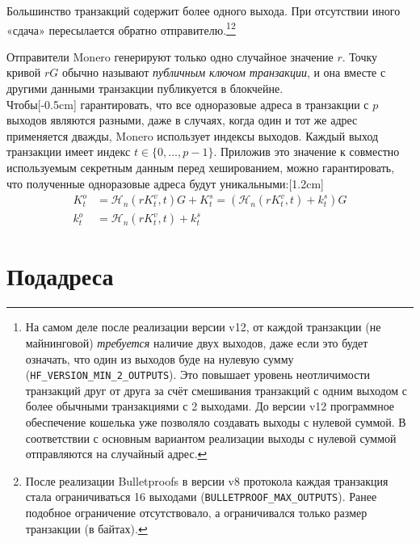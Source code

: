 Большинство транзакций содержит более одного выхода. При отсутствии иного «сдача» пересылается обратно отправителю.\footnote{На самом деле после реализации версии v12, от каждой транзакции  (не майнинговой) {\em требуется} наличие двух выходов, даже если это будет означать, что один из выходов буде на нулевую сумму ({\tt HF\_VERSION\_MIN\_2\_OUTPUTS}). Это повышает уровень неотличимости транзакций друг от друга за счёт смешивания транзакций с одним выходом с более обычными транзакциями с 2 выходами. До версии v12 программное обеспечение кошелька уже позволяло создавать выходы с нулевой суммой. В соответствии с основным вариантом реализации выходы с нулевой суммой отправляются на случайный адрес.}\footnote{После реализации Bulletproofs в версии v8 протокола каждая транзакция стала ограничиваться 16 выходами ({\tt BULLETPROOF\_MAX\_OUTPUTS}). Ранее подобное ограничение отсутствовало, а ограничивался только размер транзакции (в байтах).}%

Отправители Monero генерируют только одно случайное значение $r$. Точку кривой $r G$ обычно называют {\em публичным ключом транзакции}, и она вместе с другими данными транзакции публи\-куется в блокчейне.\\

Чтобы[-0.5cm] гарантировать, что все одноразовые адреса в транзакции с $p$ выходов являются разны\-ми, даже в случаях, когда один и тот же адрес применяется дважды, Monero использует индексы выходов. Каждый выход транзакции имеет индекс $t \in \{0, ..., p-1\}$. Приложив это значение к совместно используемым секретным данным перед хешированием, можно гарантировать, что полученные одноразовые адреса будут уникальными:[1.2cm]\vspace{.175cm}%
\begin{align*}
  K_t^o &= \mathcal{H}_n(r K_t^v, t)G + K_t^s = (\mathcal{H}_n(r K_t^v, t) + k_t^s)G  \\ 
  k_t^o &= \mathcal{H}_n(r K_t^v, t) + k_t^s
\end{align*} 



\section{Подадреса}
\label{sec:subaddresses}

